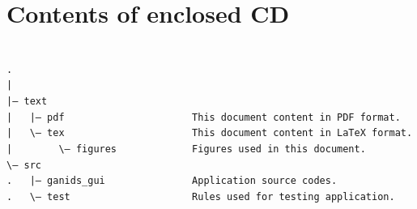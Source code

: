 \documentclass[thesis=M,english]{FITthesis}[2011/07/15]
\begin{document}
\chapter{Contents of enclosed CD}

\texttt{\\
\noindent.\\
|\\
|--\ text\\
|\ \ \ |-- pdf\ \ \ \ \ \ \ \ \ \ \ \ \ \ \ \ \ \ \ \ \ \ This document content in PDF format.\\
|\ \ \ \textbackslash--\ tex\ \ \ \ \ \ \ \ \ \ \ \ \ \ \ \ \ \ \ \ \ \ This document content in LaTeX format.\\
|\ \ \ \ \ \ \ \ \textbackslash--\ figures\ \ \ \ \ \ \ \ \ \ \ \ \ Figures used in this document.\\
\textbackslash-- src\\
.\ \ \ |-- ganids\_gui\ \ \ \ \ \ \ \ \ \ \ \ \ \ \ Application source codes.\\
.\ \ \ \textbackslash--\ test\ \ \ \ \ \ \ \ \ \ \ \ \ \ \ \ \ \ \ \ \ Rules used for testing application.\\


}
\end{document}

